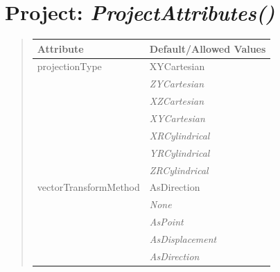 \documentclass[letterpaper,10pt,english]{sphinxmanual}
\begin{document}
\section{\textbf{Project}: \emph{ProjectAttributes()}}
\label{attributes:project-projectattributes}
\begin{DUlineblock}{0em}
\item[] 
\end{DUlineblock}
\begin{quote}

\begin{tabulary}{\linewidth}{|L|L|}
\hline

\textbf{Attribute}
 & 
\textbf{Default/Allowed Values}
\\
\hline
projectionType
 & 
XYCartesian
\\
\hline & 
\emph{ZYCartesian}
\\
\hline & 
\emph{XZCartesian}
\\
\hline & 
\emph{XYCartesian}
\\
\hline & 
\emph{XRCylindrical}
\\
\hline & 
\emph{YRCylindrical}
\\
\hline & 
\emph{ZRCylindrical}
\\
\hline
vectorTransformMethod
 & 
AsDirection
\\
\hline & 
\emph{None}
\\
\hline & 
\emph{AsPoint}
\\
\hline & 
\emph{AsDisplacement}
\\
\hline & 
\emph{AsDirection}
\\
\hline\end{tabulary}

\end{quote}

\begin{DUlineblock}{0em}
\item[] 
\end{DUlineblock}

\begin{DUlineblock}{0em}
\item[] 
\end{DUlineblock}
\end{document}
